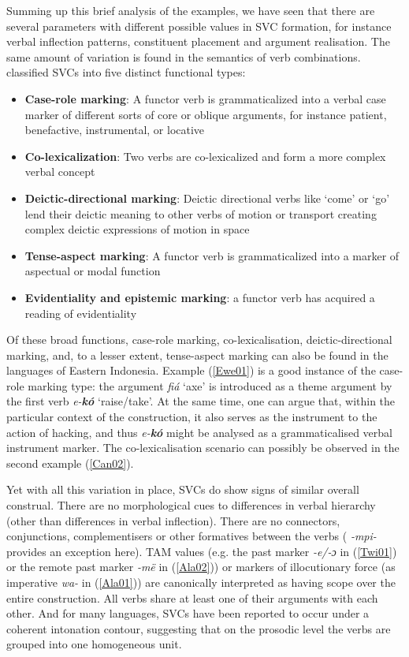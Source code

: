 Summing up this brief analysis of the examples, we have seen that there are several parameters with different possible values in SVC formation, for instance verbal inflection patterns, constituent placement and argument realisation. The same amount of variation is found in the semantics of verb combinations. \citet{givon1991serial} classified SVCs into five distinct functional types:

\begin{footnotesize}
\begin{itemize}
\item \textbf{Case-role marking}: A functor verb is grammaticalized into a verbal case marker of different sorts of core or oblique arguments, for instance patient, benefactive, instrumental, or locative
\item \textbf{Co-lexicalization}: Two verbs are co-lexicalized and form a more complex verbal concept
\item \textbf{Deictic-directional marking}: Deictic directional verbs like `come' or `go' lend their deictic meaning to other verbs of motion or transport creating complex deictic expressions of motion in space
\item \textbf{Tense-aspect marking}: A functor verb is grammaticalized into a marker of aspectual or modal function
\item \textbf{Evidentiality and epistemic marking}: a functor verb has acquired a reading of evidentiality
\end{itemize}
\end{footnotesize}

Of these broad functions, case-role marking, co-lexicalisation, deictic-direc\-tion\-al marking, and, to a lesser extent, tense-aspect marking can also be found in the languages of Eastern Indonesia. Example (\ref{Ewe01}) is a good instance of the case-role marking type: the argument \textit{fiá} `axe' is introduced as a theme argument by the first verb \textit{e-\textbf{kó}} `raise/take'. At the same time, one can argue that, within the particular context of the construction, it also serves as the instrument to the action of hacking, and thus \textit{e-\textbf{kó}} might be analysed as a grammaticalised verbal instrument marker. The co-lexicalisation scenario can possibly be observed in the second  example (\ref{Can02}).

Yet with all this variation in place, SVCs do show signs of similar overall construal. There are no morphological cues to differences in verbal hierarchy (other than differences in verbal inflection). There are no connectors, conjunctions, complementisers or other formatives between the verbs ( \textit{-mpi-} provides an exception here). TAM values (e.g. the past marker \textit{-e/-ɔ} in (\ref{Twi01}) or the remote past marker \textit{-më} in (\ref{Ala02})) or markers of illocutionary force (as imperative \textit{wa-} in (\ref{Ala01})) are canonically interpreted as having scope over the entire construction. All verbs share at least one of their arguments with each other. And for many languages, SVCs have been reported to occur under a coherent intonation contour, suggesting that on the prosodic level the verbs are grouped into one homogeneous unit.

